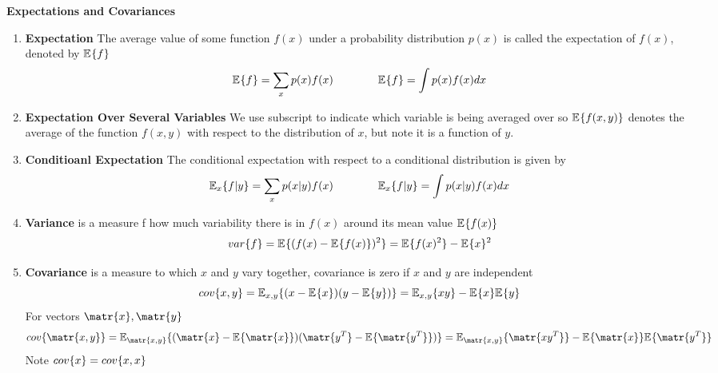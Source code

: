 \documentclass[11pt]{article}
\begin{document}
\begin{defn*}
    \textbf{Expectations and Covariances} 
    \begin{enumerate}
        \item \textbf{Expectation} The average value of some function $f(x)$ under a probability distribution $p(x)$ is called the expectation of $f(x)$, denoted by $\E{f}$
        \[
            \E{f} = \sum_x p(x)f(x) 
            \quad \quad \quad \quad 
            \E{f} = \int p(x)f(x) dx 
        \]
        \item \textbf{Expectation Over Several Variables} We use subscript to indicate which variable is being averaged over so $\E{f(x,y)}$ denotes the average of the function $f(x,y)$ with respect to the distribution of $x$, but note it is a function of $y$. 
        \item \textbf{Conditioanl Expectation} The conditional expectation with respect to a conditional distribution is given by 
        \[
            \E[x]{f|y} =\sum_x p(x|y) f(x)
            \quad \quad \quad \quad 
            \E[x]{f|y} = \int p(x|y)f(x)dx
        \]
        \item \textbf{Variance} is a measure f how much variability there is in $f(x)$ around its mean value $\E{f(x)}$
        \[  
            \var{f} 
            = \E{(f(x) - \E{f(x)})^2}
            = \E{f(x)^2} - \E{x}^2
        \]
        \item \textbf{Covariance} is a measure to which $x$ and $y$ vary together, covariance is zero if $x$ and $y$ are independent
        \[
            \cov{x,y} 
            = \E[x,y]{(x-\E{x})(y-\E{y})} 
            = \E[x,y]{xy} - \E{x}\E{y}
        \]
        For vectors $\matr{x}, \matr{y}$ 
        \[
            \cov{\matr{x,y}}
            = \E[\matr{x,y}]{(\matr{x}-\E{\matr{x}})(\matr{y^T} - \E{\matr{y^T}})}
            = \E[\matr{x,y}]{\matr{xy^T}}-  \E{\matr{x}}\E{\matr{y^T}}
        \]
        Note $\cov{x} = \cov{x,x}$
    \end{enumerate}
\end{defn*}
\end{document}
